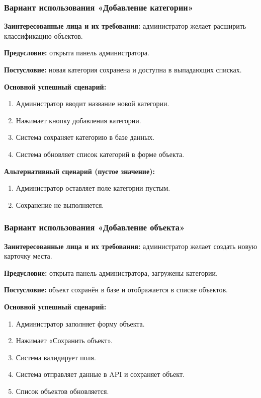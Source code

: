 \subsubsection{Вариант использования «Добавление категории»}
\textbf{Заинтересованные лица и их требования:} администратор желает расширить классификацию объектов.

\textbf{Предусловие:} открыта панель администратора.

\textbf{Постусловие:} новая категория сохранена и доступна в выпадающих списках.

\textbf{Основной успешный сценарий:}
\begin{enumerate}
	\item Администратор вводит название новой категории.
	\item Нажимает кнопку добавления категории.
	\item Система сохраняет категорию в базе данных.
	\item Система обновляет список категорий в форме объекта.
\end{enumerate}

\textbf{Альтернативный сценарий (пустое значение):}
\begin{enumerate}
	\item Администратор оставляет поле категории пустым.
	\item Сохранение не выполняется.
\end{enumerate}

\subsubsection{Вариант использования «Добавление объекта»}
\textbf{Заинтересованные лица и их требования:} администратор желает создать новую карточку места.

\textbf{Предусловие:} открыта панель администратора, загружены категории.

\textbf{Постусловие:} объект сохранён в базе и отображается в списке объектов.

\textbf{Основной успешный сценарий:}
\begin{enumerate}
	\item Администратор заполняет форму объекта.
	\item Нажимает «Сохранить объект».
	\item Система валидирует поля.
	\item Система отправляет данные в API и сохраняет объект.
	\item Список объектов обновляется.
\end{enumerate}

